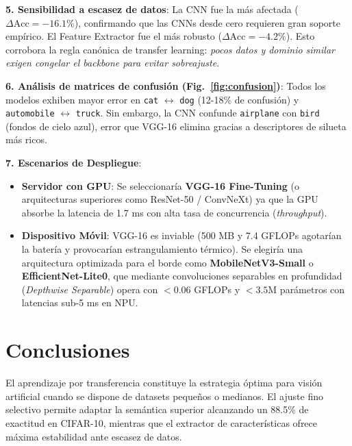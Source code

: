 \documentclass[10pt,twocolumn,a4paper]{article}
\begin{document}
\textbf{5. Sensibilidad a escasez de datos}: La CNN fue la más afectada ($\Delta\text{Acc}=-16.1\%$), confirmando que las CNNs desde cero requieren gran soporte empírico. El Feature Extractor fue el más robusto ($\Delta\text{Acc}=-4.2\%$). Esto corrobora la regla canónica de transfer learning: \textit{pocos datos y dominio similar exigen congelar el backbone para evitar sobreajuste}.

\textbf{6. Análisis de matrices de confusión (Fig.~\ref{fig:confusion})}: Todos los modelos exhiben mayor error en \texttt{cat} $\leftrightarrow$ \texttt{dog} (12-18\% de confusión) y \texttt{automobile} $\leftrightarrow$ \texttt{truck}. Sin embargo, la CNN confunde \texttt{airplane} con \texttt{bird} (fondos de cielo azul), error que VGG-16 elimina gracias a descriptores de silueta más ricos.

\textbf{7. Escenarios de Despliegue}:
\begin{itemize}\setlength\itemsep{0em}
    \item \textbf{Servidor con GPU}: Se seleccionaría \textbf{VGG-16 Fine-Tuning} (o arquitecturas superiores como ResNet-50 / ConvNeXt) ya que la GPU absorbe la latencia de 1.7 ms con alta tasa de concurrencia (\textit{throughput}).
    \item \textbf{Dispositivo Móvil}: VGG-16 es inviable (500 MB y 7.4 GFLOPs agotarían la batería y provocarían estrangulamiento térmico). Se elegiría una arquitectura optimizada para el borde como \textbf{MobileNetV3-Small} o \textbf{EfficientNet-Lite0}, que mediante convoluciones separables en profundidad (\textit{Depthwise Separable}) opera con $<0.06$ GFLOPs y $<3.5$M parámetros con latencias sub-5 ms en NPU.
\end{itemize}

\section{Conclusiones}
El aprendizaje por transferencia constituye la estrategia óptima para visión artificial cuando se dispone de datasets pequeños o medianos. El ajuste fino selectivo permite adaptar la semántica superior alcanzando un 88.5\% de exactitud en CIFAR-10, mientras que el extractor de características ofrece máxima estabilidad ante escasez de datos.

\vspace{0.4cm}
\noindent{}
\end{document}
